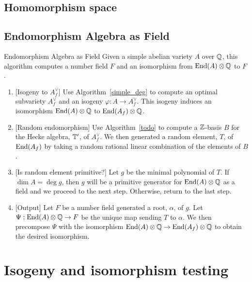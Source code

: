 \subsection{Homomorphism space}%
\label{sub:_hom_a_b_}

\subsection{Endomorphism Algebra as Field}%
\label{sub:endomorphism_algebra_as_field}

\begin{algorithm}{Endomorphism Algebra as Field}
    Given a simple abelian variety $A$ over $\mathbb{Q}$, this algorithm computes a
    number field $F$ and an isomorphism from $\operatorname{End}(A)\otimes \mathbb{Q}$ to $F$.
    \begin{enumerate}
        \item{} [Isogeny to $A_f ^\vee$]
            Use Algorithm~\ref{simple_deg} to compute an optimal subvariety
            $A_f ^\vee$ and an isogeny $\varphi:A\to A_f ^\vee$. This isogeny
            induces an isomorphism $\operatorname{End}(A)\otimes\mathbb{Q}$ to $\operatorname{End}(A_f)\otimes
            \mathbb{Q}$.
        \item{} [Random endomorphism]
            Use Algorithm~\ref{todo} to compute a $\mathbb{Z}$-basis $B$ for the Hecke
            algebra, $\mathbb{T}'$, of $A_f ^\vee$. We then generated a random
            element, $T$, of $\operatorname{End}(A_f)$ by taking a random rational linear
            combination of the elements of $B$.
        \item{} [Is random element primitive?]
            Let $g$ be the minimal polynomial of $T$. If $\dim A = \deg g$,
            then $g$ will be a primitive generator for $\operatorname{End}(A)\otimes \mathbb{Q}$ as
            a field and we proceed to the next step. Otherwise, return to the
            last step.
        \item{} [Output]
            Let $F$ be a number field generated a root, $\alpha$, of $g$. Let
            $\Psi:\operatorname{End}(A)\otimes \mathbb{Q}\to F$ be the unique map sending $T$ to
            $\alpha$. We then precompose $\Psi$ with the isomorphism
            $\operatorname{End}(A)\otimes \mathbb{Q} \to \operatorname{End}(A_f)\otimes \mathbb{Q}$ to obtain the
            desired isomorphism.
    \end{enumerate}
\end{algorithm}



\section{Isogeny and isomorphism testing}

